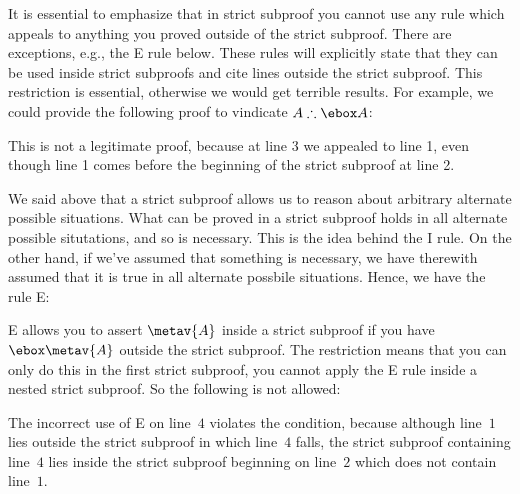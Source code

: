 It is essential to emphasize that in strict subproof you cannot use any rule which appeals to anything you proved outside of the strict subproof. There are exceptions, e.g., the \ebox E rule below. These rules will explicitly state that they can be used inside strict subproofs and cite lines outside the strict subproof. This restriction is essential, otherwise we would get terrible results. For example, we could provide the following proof to vindicate $A\therefore \ebox A$:
\begin{fitchproof}
		\PR
		\open
		\AS
		\close
\end{fitchproof}
This is not a legitimate proof, because at line 3 we appealed to line 1, even though line 1 comes before the beginning of the strict subproof at line 2.

We said above that a strict subproof allows us to reason about arbitrary alternate possible situations. What can be proved in a strict subproof holds in all alternate possible situtations, and so is necessary. This is the idea behind the \ebox I rule. On the other hand, if we've assumed that something is necessary, we have therewith assumed that it is true in all alternate possbile situations.  Hence, we have the rule \ebox E:

\ebox E allows you to assert $\metav{A}$ inside a strict subproof if you have $\ebox \metav{A}$ outside the strict subproof. The restriction means that you can only do this in the first strict subproof, you cannot apply the \ebox E rule inside a nested strict subproof. So the following is not allowed:
\begin{fitchproof}
	\open
	\AS
	\open
	\AS
\close\close
\end{fitchproof}
The incorrect use of \ebox E on line~$4$ violates the condition, because although line~$1$ lies outside the strict subproof in which line~$4$ falls, the strict subproof containing line~$4$ lies inside the strict subproof beginning on line~$2$ which does not contain line~$1$.

